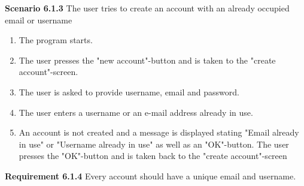 \documentclass{article}
\begin{document}
\textbf{Scenario 6.1.3} The user tries to create an account with an already occupied email or username
\\
\begin{enumerate}
    \item The program starts.
    \item The user presses the "new account"-button and is taken to the "create account"-screen.
    \item The user is asked to provide username, email and password.
    \item The user enters a username or an e-mail address already in use.
    \item An account is not created and a message is displayed stating "Email already in use" or "Username already in use" as well as an "OK"-button. The user presses the "OK"-button and is taken back to the "create account"-screen
\end{enumerate}

\textbf{Requirement 6.1.4} Every account should have a unique email and username.
\end{document}

